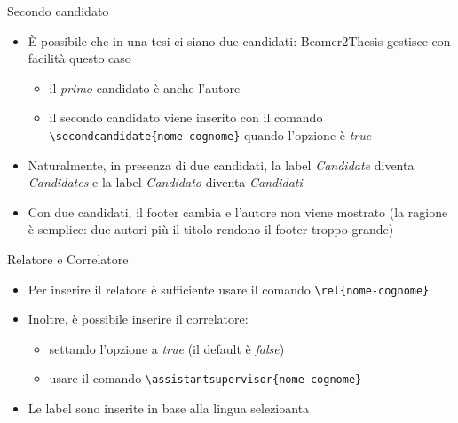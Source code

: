 \begin{frame}[t,fragile]{Secondo candidato}
\begin{itemize}
\item \`{E} possibile che in una tesi ci siano due candidati: Beamer2Thesis gestisce con facilità questo caso
\begin{itemize}
\item il \emph{primo} candidato è anche l'autore
\item il secondo candidato viene inserito con il comando \verb!\secondcandidate{nome-cognome}! quando l'opzione  è \emph{true}
\end{itemize}
\item Naturalmente, in presenza di due candidati, la label \emph{Candidate} diventa \emph{Candidates} e la label \emph{Candidato} diventa \emph{Candidati}
\item Con due candidati, il footer cambia e l'autore non viene mostrato (la ragione è semplice: due autori più il titolo rendono il footer troppo grande)
\end{itemize}
\end{frame}

\begin{frame}[t,fragile]{Relatore e Correlatore}
\begin{itemize}
\item Per inserire il relatore è sufficiente usare il comando \verb!\rel{nome-cognome}!
\item Inoltre, è possibile inserire il correlatore:
\begin{itemize}
\item settando l'opzione  a \emph{true} (il default è \emph{false})
\item usare il comando \verb!\assistantsupervisor{nome-cognome}!
\end{itemize}
\item Le label sono inserite in base alla lingua selezioanta
\end{itemize}
\end{frame}

